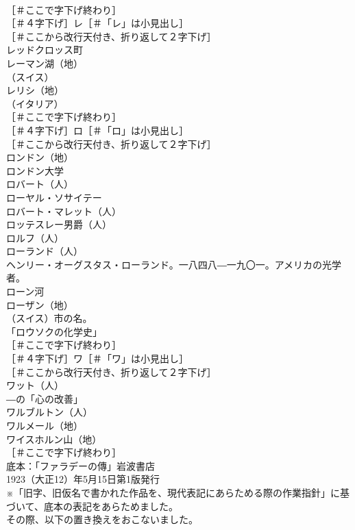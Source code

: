 \documentclass[8pt]{extreport}
\begin{document}
\begin{CJK}{UTF8}{min}
\\	［＃ここで字下げ終わり］
\\	［＃４字下げ］レ［＃「レ」は小見出し］
\\	［＃ここから改行天付き、折り返して２字下げ］
\\	レッドクロッス町 
\\	レーマン湖（地）
\\	（スイス）
\\	レリシ（地）
\\	（イタリア）
\\	［＃ここで字下げ終わり］
\\	［＃４字下げ］ロ［＃「ロ」は小見出し］
\\	［＃ここから改行天付き、折り返して２字下げ］
\\	ロンドン（地）
\\	ロンドン大学 
\\	ロバート（人）
\\	ローヤル・ソサイテー 
\\	ロバート・マレット（人）
\\	ロッテスレー男爵（人）
\\	ロルフ（人）
\\	ローランド（人）
\\	ヘンリー・オーグスタス・ローランド。一八四八―一九〇一。アメリカの光学者。
\\	ローン河 
\\	ローザン（地）
\\	（スイス）市の名。
\\	「ロウソクの化学史」
\\	［＃ここで字下げ終わり］
\\	［＃４字下げ］ワ［＃「ワ」は小見出し］
\\	［＃ここから改行天付き、折り返して２字下げ］
\\	ワット（人）
\\	―の「心の改善」
\\	ワルブルトン（人）
\\	ワルメール（地）
\\	ワイスホルン山（地）
\\	［＃ここで字下げ終わり］
\\	底本：「ファラデーの傳」岩波書店
\\	1923（大正12）年5月15日第1版発行
\\	※「旧字、旧仮名で書かれた作品を、現代表記にあらためる際の作業指針」に基づいて、底本の表記をあらためました。
\\	その際、以下の置き換えをおこないました。

\end{CJK}
\end{document}
